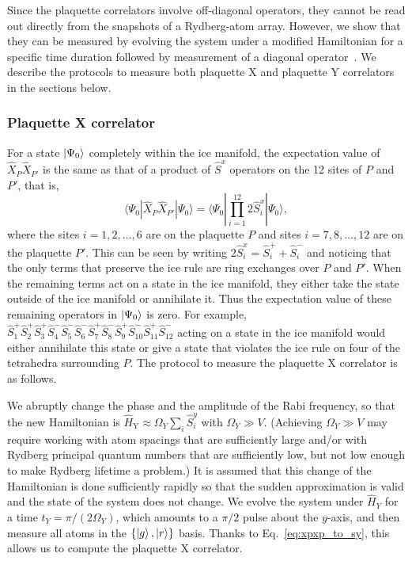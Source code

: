 \documentclass[twocolumn,superscriptaddress,amsmath,amssymb,aps,prx,nofootinbib]{revtex4-2}
\begin{document}
Since the plaquette correlators involve off-diagonal operators, they cannot be read out directly from the snapshots of a Rydberg-atom array. However, we show  that they can be measured by evolving the system under a modified Hamiltonian for a specific time duration followed by measurement of a diagonal operator~\cite{verresen2021, semeghini2021}. We describe the protocols to measure both plaquette X and plaquette Y correlators in the sections below.



\subsubsection{Plaquette X correlator} \label{sec:x_plaq_corr}

For a state $\ket{\Psi_0}$ completely within the ice manifold, the expectation value of $\hat{X}_P \hat{X}_{P'} $ is the same as that of a product of $\hat{S}^x$ operators on the 12 sites of $P$ and $P'$, that is, 
\begin{equation} \label{eq:xpxp_to_sy}
  \langle \Psi_0 | \hat{X}_P \hat{X}_{P'}| \Psi_0 \rangle  =  \langle \Psi_0 | \prod_{i=1}^{12}  2\hat{S}^x_i  | \Psi_0 \rangle ,
\end{equation}
where the sites $i=1,2,\ldots,6$ are on the plaquette $P$ and sites $i = 7,8,\ldots,12$ are on the plaquette $P'$. This can be seen by writing $2\hat{S}^x_i  = \hat{S}^+_i + \hat{S}^-_i$ and noticing that the only terms that preserve the ice rule are ring exchanges over $P$ and $P'$. When the remaining terms act on a state in the ice manifold, they either take the state outside of the ice manifold or annihilate it. Thus the  expectation value of these remaining operators in $\ket{\Psi_0}$ is zero. For example, $\hat{S}_1^+ \hat{S}_2^+ \hat{S}_3^+ \hat{S}_4^- \hat{S}_5^- \hat{S}_6^- \hat{S}_{7}^+ \hat{S}_{8}^- \hat{S}_{9}^+ \hat{S}_{10}^- \hat{S}_{11}^+ \hat{S}_{12}^{-}$ acting on a state in the ice manifold would either annihilate this state or give a state that violates the ice rule on four of the tetrahedra surrounding $P$. The protocol to measure the plaquette X correlator is as follows.


We abruptly change the phase and the amplitude of the Rabi frequency, so that the new Hamiltonian is $\hat{H}_\text{Y} \approx \Omega_Y \sum_i \hat{S}^y_i$ with $\Omega_Y \gg V$. (Achieving $\Omega_Y \gg V$ may require working with atom spacings that are sufficiently large and/or with Rydberg principal quantum numbers that are sufficiently low, but not low enough to make Rydberg lifetime a problem.) It is assumed that this change of the Hamiltonian is done sufficiently rapidly so that the sudden approximation is valid and the state of the system does not change. We evolve the system under $\hat{H}_Y$ for a time  $t_Y = \pi/(2 \Omega_Y)$, which amounts to a $\pi/2$ pulse about the $y$-axis, and then measure all atoms in the $\{\ket{g},\ket{r}\}$ basis. Thanks to Eq.~\eqref{eq:xpxp_to_sy}, this allows us to compute the plaquette X correlator. 
\end{document}
